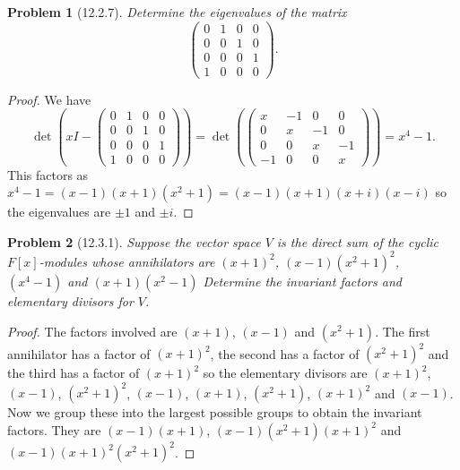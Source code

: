 \documentclass{article}
\newtheorem{problem}{Problem}
\begin{document}
\begin{problem}[12.2.7]
Determine the eigenvalues of the matrix
\[
\left(
\begin{array}{cccc}
0 & 1 & 0 & 0\\
0 & 0 & 1 & 0\\
0 & 0 & 0 & 1\\
1 & 0 & 0 & 0
\end{array}
\right ).
\]
\end{problem}
\begin{proof}
We have
\[
\det \left ( xI - \left(
\begin{array}{cccc}
0 & 1 & 0 & 0\\
0 & 0 & 1 & 0\\
0 & 0 & 0 & 1\\
1 & 0 & 0 & 0
\end{array}
\right ) \right )
=
\det \left ( \left(
\begin{array}{cccc}
x & -1 & 0 & 0\\
0 & x & -1 & 0\\
0 & 0 & x & -1\\
-1 & 0 & 0 & x
\end{array}
\right ) \right )
= x^4 - 1.
\]
This factors as $x^4 - 1 = (x-1)(x+1)(x^2 + 1) = (x-1)(x+1)(x+i)(x-i)$ so the eigenvalues are $\pm 1$ and $\pm i$.
\end{proof}

\begin{problem}[12.3.1]
Suppose the vector space $V$ is the direct sum of the cyclic $F[x]$-modules whose annihilators are $(x+1)^2$, $(x-1)(x^2+1)^2$, $(x^4-1)$ and $(x+1)(x^2-1)$ Determine the invariant factors and elementary divisors for $V$.
\end{problem}
\begin{proof}
The factors involved are $(x+1)$, $(x-1)$ and $(x^2+1)$. The first annihilator has a factor of $(x+1)^2$, the second has a factor of $(x^2+1)^2$ and the third has a factor of $(x+1)^2$ so the elementary divisors are $(x+1)^2$, $(x-1)$, $(x^2+1)^2$, $(x-1)$, $(x+1)$, $(x^2+1)$, $(x+1)^2$ and $(x-1)$. Now we group these into the largest possible groups to obtain the invariant factors. They are $(x-1)(x+1)$, $(x-1)(x^2+1)(x+1)^2$ and $(x-1)(x+1)^2(x^2+1)^2$.
\end{proof}
\end{document}
